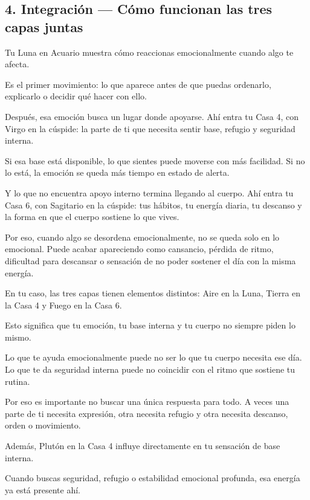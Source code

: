 \documentclass[11pt,a4paper]{article}
\begin{document}
\vspace{0.8cm}

\subsection{4. Integración — Cómo funcionan las tres capas juntas}

Tu Luna en Acuario muestra cómo reaccionas emocionalmente cuando algo te afecta.

Es el primer movimiento: lo que aparece antes de que puedas ordenarlo, explicarlo o decidir qué hacer con ello.

Después, esa emoción busca un lugar donde apoyarse. Ahí entra tu Casa 4, con Virgo en la cúspide: la parte de ti que necesita sentir base, refugio y seguridad interna.

Si esa base está disponible, lo que sientes puede moverse con más facilidad.
Si no lo está, la emoción se queda más tiempo en estado de alerta.

Y lo que no encuentra apoyo interno termina llegando al cuerpo. Ahí entra tu Casa 6, con Sagitario en la cúspide: tus hábitos, tu energía diaria, tu descanso y la forma en que el cuerpo sostiene lo que vives.

Por eso, cuando algo se desordena emocionalmente, no se queda solo en lo emocional. Puede acabar apareciendo como cansancio, pérdida de ritmo, dificultad para descansar o sensación de no poder sostener el día con la misma energía.

En tu caso, las tres capas tienen elementos distintos: Aire en la Luna, Tierra en la Casa 4 y Fuego en la Casa 6.

Esto significa que tu emoción, tu base interna y tu cuerpo no siempre piden lo mismo.

Lo que te ayuda emocionalmente puede no ser lo que tu cuerpo necesita ese día. Lo que te da seguridad interna puede no coincidir con el ritmo que sostiene tu rutina.

Por eso es importante no buscar una única respuesta para todo. A veces una parte de ti necesita expresión, otra necesita refugio y otra necesita descanso, orden o movimiento.

Además, Plutón en la Casa 4 influye directamente en tu sensación de base interna.

Cuando buscas seguridad, refugio o estabilidad emocional profunda, esa energía ya está presente ahí.
\end{document}
